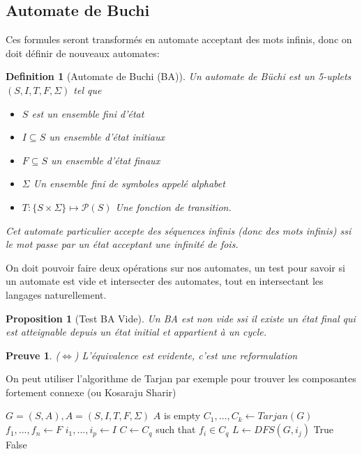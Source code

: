 \documentclass{paper}
\newtheorem{proposition}{Proposition}
\newtheorem{definition}{Definition}
\newtheorem{preuve}{Preuve}
\begin{document}
\subsection{Automate de Buchi}
    Ces formules seront transformés en automate acceptant des mots infinis, donc on doit définir de nouveaux automates:
    \begin{definition}[Automate de Buchi (BA)]
        Un automate de Büchi est un 5-uplets $(S, I, T, F, \Sigma)$ tel que
        \begin{itemize}
            \item $S$ est un ensemble fini d'état
            \item $I\subseteq S$ un ensemble d'état initiaux
            \item $F\subseteq S$ un ensemble d'état finaux
            \item $\Sigma$ Un ensemble fini de symboles appelé alphabet
            \item $T: \{S\times \Sigma\}\mapsto \mathcal{P}(S)$ Une fonction de transition.
        \end{itemize}
        Cet automate particulier accepte des séquences infinis (donc des mots infinis) ssi le mot passe par un état acceptant une infinité de fois.
    \end{definition}
    On doit pouvoir faire deux opérations sur nos automates, un test pour savoir si un automate est vide et intersecter des automates, tout en intersectant les langages naturellement.
    \begin{proposition}[Test BA Vide]
        Un BA est non vide ssi il existe un état final qui est atteignable depuis un état initial et appartient à un cycle.
    \end{proposition}
    \begin{preuve}
        ($\Leftrightarrow$) L'équivalence est evidente, c'est une reformulation
    \end{preuve}

    On peut utiliser l'algorithme de Tarjan par exemple pour trouver les composantes fortement connexe (ou Kosaraju Sharir)
    \begin{algorithm}
    \caption{Cycle Detection}\label{alg:cap}
    \begin{algorithmic}
        \Require $G=(S,A), A=(S,I,T,F,\Sigma)$ 
        \Ensure $A$ is empty
        \State $C_1,\dots,C_k \gets Tarjan(G)$
        \State $f_1,...,f_n \gets F$
        \State $i_1,...,i_p \gets I$
            \State $C\gets C_q$ such that $f_i\in C_q$ 
                    \State $L \gets DFS(G, i_j)$
                        \Return True
                    \EndIf
                \EndFor
            \EndIf
        \EndFor
        \State \Return False
    \end{algorithmic}
    \end{algorithm}
\end{document}
